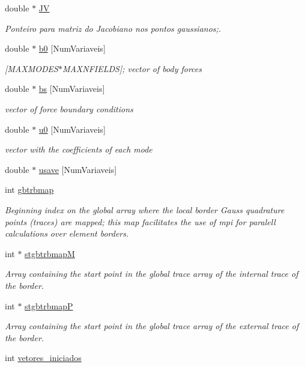 \begin{DoxyCompactItemize}
double $\ast$ \hyperlink{classPhElem_a569278e8b30ca90d0e6f920b5bba7dd5}{JV}
\begin{DoxyCompactList}\small\item\em Ponteiro para matriz do Jacobiano nos pontos gaussianos;. \end{DoxyCompactList}\item 
double $\ast$ \hyperlink{classPhElem_aeaebffae27dd713bbc06ad07b7b727a3}{b0} \mbox{[}Num\+Variaveis\mbox{]}
\begin{DoxyCompactList}\small\item\em \mbox{[}M\+A\+X\+M\+O\+D\+E\+S$\ast$\+M\+A\+X\+N\+F\+I\+E\+L\+DS\mbox{]}; vector of body forces \end{DoxyCompactList}\item 
double $\ast$ \hyperlink{classPhElem_a42b747116ec9223cdebbc424e27f4089}{bs} \mbox{[}Num\+Variaveis\mbox{]}
\begin{DoxyCompactList}\small\item\em vector of force boundary conditions \end{DoxyCompactList}\item 
double $\ast$ \hyperlink{classPhElem_a560dc47ac8a684d84b05851ce52e044b}{u0} \mbox{[}Num\+Variaveis\mbox{]}
\begin{DoxyCompactList}\small\item\em vector with the coefficients of each mode \end{DoxyCompactList}\item 
double $\ast$ \hyperlink{classPhElem_a98781f3744597bad01eff75b31734d4b}{usave} \mbox{[}Num\+Variaveis\mbox{]}
\item 
int \hyperlink{classPhElem_a8188f64662092eb065a85d49f3ae6649}{gbtrbmap}
\begin{DoxyCompactList}\small\item\em Beginning index on the global array where the local border Gauss quadrature points (traces) are mapped; this map facilitates the use of mpi for paralell calculations over element borders. \end{DoxyCompactList}\item 
int $\ast$ \hyperlink{classPhElem_aebcf76eedfef93aef801fa3cab9c2708}{stgbtrbmapM}
\begin{DoxyCompactList}\small\item\em Array containing the start point in the global trace array of the internal trace of the border. \end{DoxyCompactList}\item 
int $\ast$ \hyperlink{classPhElem_a6b38afded290e7a4cfb4a215a7ebec4e}{stgbtrbmapP}
\begin{DoxyCompactList}\small\item\em Array containing the start point in the global trace array of the external trace of the border. \end{DoxyCompactList}\item 
int \hyperlink{classPhElem_a65f545dc1bf0d90240419934eb711a9d}{vetores\+\_\+iniciados}
\end{DoxyCompactItemize}


